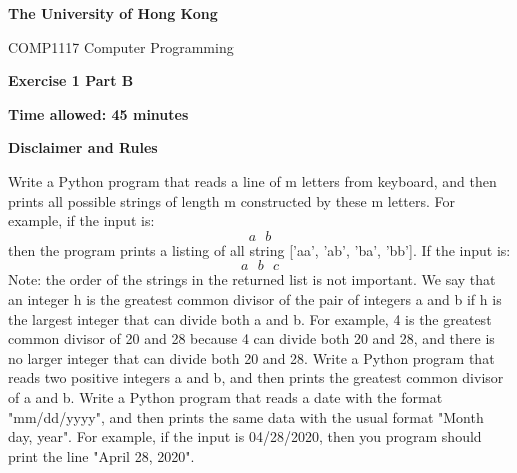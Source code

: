 \documentclass{exam}
\begin{document}
\thispagestyle{plain}
\begin{center}
    \Large
    \textbf{The University of Hong Kong}
        
    \vspace{0.4cm}
    \large
    COMP1117 Computer Programming
        
    \vspace{0.4cm}
    \textbf{Exercise 1 Part B}

    \vspace{0.4cm}
    \textbf{Time allowed: 45 minutes}

    \vspace{0.4cm}
    \textbf{Disclaimer and Rules}
\end{center}
\begin{center}
\end{center}
\begin{questions}
		\marksnotpoints
    \question[10] Write a Python program that reads a line of m letters from keyboard, and then prints all possible strings of length m constructed by these m letters. For example, if the input is:
    \begin{equation*}
        a\text{ }b
    \end{equation*}
    then the program prints a listing of all string ['aa', 'ab', 'ba', 'bb']. If the input is:
    \begin{equation*}
        a\text{ }b\text{ }c
    \end{equation*}
    Note: the order of the strings in the returned list is not important.
    \question[20]
    We say that an integer h is the greatest common divisor of the pair of integers a and b if h is the largest integer that can divide both a and b. For example, 4 is the greatest common divisor of 20 and 28 because 4 can divide both 20 and 28, and there is no larger integer that can divide both 20 and 28. Write a Python program that reads two positive integers a and b, and then prints the greatest common divisor of a and b.
    \question[20]
    Write a Python program that reads a date with the format "mm/dd/yyyy", and then prints the same data with the usual format "Month day, year". For example, if the input is 04/28/2020, then you program should print the line "April 28, 2020".
\end{questions}
\end{document}
